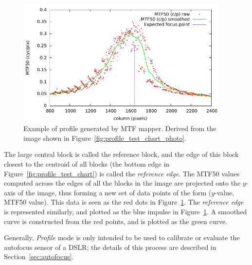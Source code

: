 \documentclass[a4paper]{article}
\begin{document}
\begin{figure}[!hb]
\centering
\includegraphics[width=0.95\textwidth]{figures/sample_profile}
\caption{Example of profile generated by MTF mapper. Derived from the image
shown in Figure~\ref{fig:profile_test_chart_photo}.}
\label{fig:sample_profile}
\end{figure}

The large central block is called the reference block, and the edge of this block closest to the
centroid of all blocks (the bottom edge in
Figure~\ref{fig:profile_test_chart}) is called the \emph{reference edge}.
The MTF50 values computed across the edges of all the blocks in the image
are projected onto the $y$-axis of the image, thus forming a new set of data
points of the form ($y$-value, MTF50 value). This data is seen as the red
dots in Figure~\ref{fig:sample_profile}. The \emph{reference edge} is
represented similarly, and plotted as the blue impulse in
Figure~\ref{fig:sample_profile}. A smoothed curve is constructed from the red
points, and is plotted as the green curve.

Generally, \emph{Profile} mode is only intended to be used to calibrate or
evaluate the autofocus sensor of a DSLR; the details of this process are
described in Section~\ref{sec:autofocus}.
\end{document}
